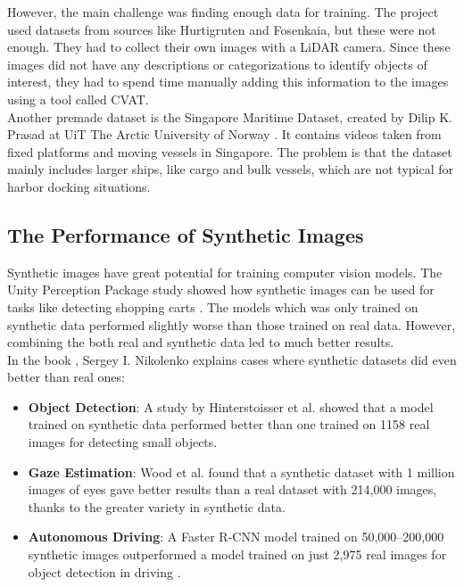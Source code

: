 \noindent However, the main challenge was finding enough data for training. The project used datasets from sources like Hurtigruten and Fosenkaia, but these were not enough. They had to collect their own images with a LiDAR camera. Since these images did not have any descriptions or categorizations to identify objects of interest, they had to spend time manually adding this information to the images using a tool called CVAT.\\



\noindent Another premade dataset is the Singapore Maritime Dataset, created by Dilip K. Prasad at UiT The Arctic University of Norway \cite{SingaporeMaritimeDataset}. It contains videos taken from fixed platforms and moving vessels in Singapore. The problem is that the dataset mainly includes larger ships, like cargo and bulk vessels, which are not typical for harbor docking situations.

\subsection{The Performance of Synthetic Images}

Synthetic images have great potential for training computer vision models. The Unity Perception Package study showed how synthetic images can be used for tasks like detecting shopping carts \cite{borkman2021unityperceptiongeneratesynthetic}. The models which was only trained on synthetic data performed slightly worse than those trained on real data. However, combining the both real and synthetic data led to much better results. \\

\noindent In the book \cite{nikolenko2021synthetic}, Sergey I. Nikolenko explains cases where synthetic datasets did even better than real ones:
\begin{itemize}
    \item \textbf{Object Detection}: A study by Hinterstoisser et al. \cite{hinter} showed that a model trained on synthetic data performed better than one trained on 1158 real images for detecting small objects. 
    \item \textbf{Gaze Estimation}: Wood et al. \cite{wood} found that a synthetic dataset with 1 million images of eyes gave better results than a real dataset with 214,000 images, thanks to the greater variety in synthetic data. 
    \item \textbf{Autonomous Driving}: A Faster R-CNN model trained on 50,000--200,000 synthetic images outperformed a model trained on just 2,975 real images for object detection in driving \cite{r-cnn}.
\end{itemize}

